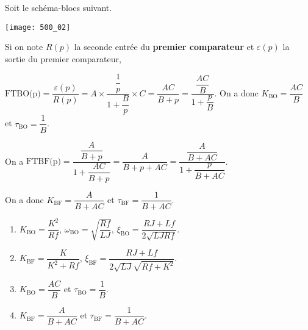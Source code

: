 \ifprof 
\else
Soit le schéma-blocs suivant.
\begin{marginfigure}
\texttt{[image: 500\_02]}
\end{marginfigure}
 \fi
 
\ifprof
Si on note $R(p)$ la seconde entrée du \textbf{premier comparateur} et $\varepsilon(p)$ la sortie du premier comparateur,  

$\text{FTBO(p)}=\dfrac{\varepsilon(p)}{R(p)} = A \times \dfrac{\dfrac{1}{p}}{1+\dfrac{B}{p}}\times C = \dfrac{AC}{B+p} = \dfrac{\dfrac{AC}{B}}{1+\dfrac{p}{B}}$.
On a donc $K_{\text{BO}}=\dfrac{AC}{B}$ et $\tau_{\text{BO}}=\dfrac{1}{B}$.

\else 
\fi

 
\ifprof
On a
$\text{FTBF(p)} = \dfrac{\dfrac{A}{B+p}}{1+\dfrac{AC}{B+p}}=\dfrac{A}{B+p+AC}=\dfrac{\dfrac{A}{B+AC}}{1+\dfrac{p}{B+AC}}$.

On a donc $K_{\text{BF}}=\dfrac{A}{B+AC}$ et $\tau_{\text{BF}}=\dfrac{1}{B+AC}$.

\else 
\fi




 

\ifprof
\else
\begin{solution}
\begin{enumerate}
\item $K_{\text{BO}}=\dfrac{K^2}{Rf}$, 
$\omega_{\text{BO}} = \sqrt{\dfrac{Rf}{LJ}}$,
$\xi_{\text{BO}} =\dfrac{RJ+Lf}{2\sqrt{LJRf}}$.
\item $K_{\text{BF}}=\dfrac{K}{K^2+Rf}$, 
$\xi_{\text{BF}}=\dfrac{RJ+Lf}{2\sqrt{LJ}\sqrt{Rf+K^2}}$.
\item $K_{\text{BO}}=\dfrac{AC}{B}$ et $\tau_{\text{BO}}=\dfrac{1}{B}$.
\item $K_{\text{BF}}=\dfrac{A}{B+AC}$ et $\tau_{\text{BF}}=\dfrac{1}{B+AC}$.
\end{enumerate}
\end{solution}

\fi